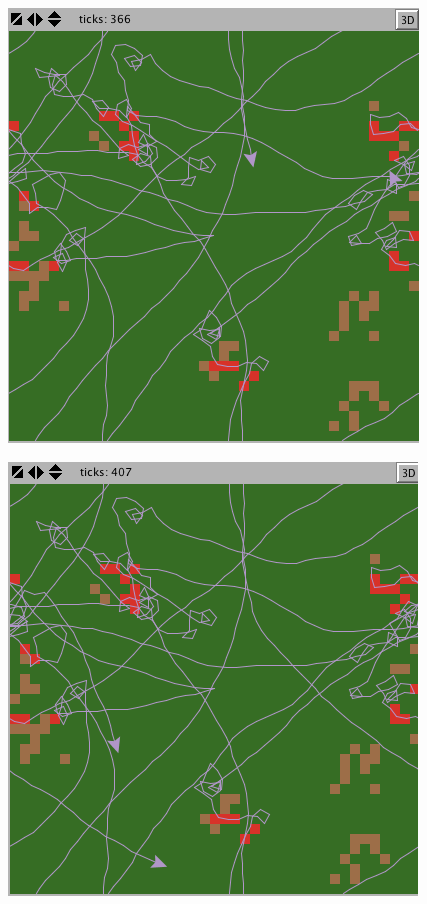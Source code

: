 \documentclass{hw}
\begin{document}
\begin{enumerate}
\begin{minipage}{0.3\textwidth}
\includegraphics[scale=0.3]{ff_01.png}
\end{minipage}
\begin{minipage}{0.3\textwidth}
\includegraphics[scale=0.3]{ff_02.png}
\end{minipage}
\begin{minipage}{0.3\textwidth}

\end{minipage}
\end{enumerate}
\end{document}
